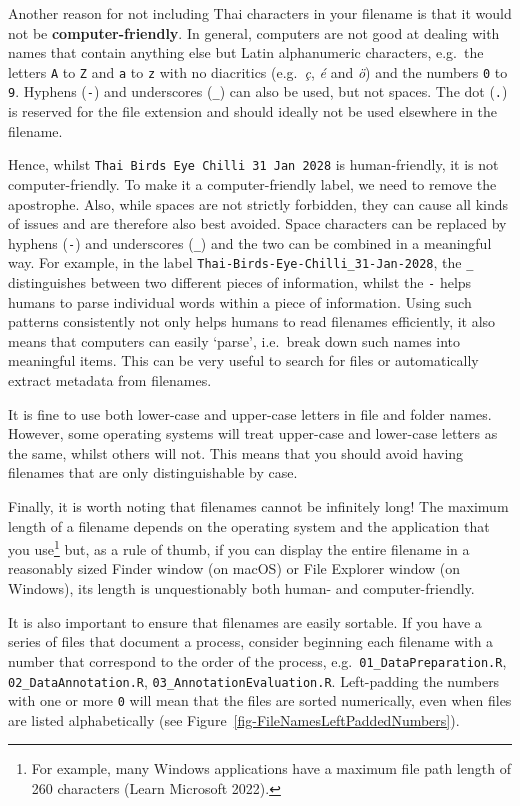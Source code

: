 \documentclass[
  letterpaper,
  DIV=11,
  numbers=noendperiod]{scrreprt}
\begin{document}
Another reason for not including Thai characters in your filename is
that it would not be \textbf{computer-friendly}. In general, computers
are not good at dealing with names that contain anything else but Latin
alphanumeric characters, e.g.~the letters \texttt{A} to \texttt{Z} and
\texttt{a} to \texttt{z} with no diacritics (e.g.~\emph{ç}, \emph{é} and
\emph{ö}) and the numbers \texttt{0} to \texttt{9}. Hyphens (\texttt{-})
and underscores (\texttt{\_}) can also be used, but not spaces. The dot
(\texttt{.}) is reserved for the file extension and should ideally not
be used elsewhere in the filename.

Hence, whilst
\texttt{Thai\ Bird\textquotesingle{}s\ Eye\ Chilli\ 31\ Jan\ 2028} is
human-friendly, it is not computer-friendly. To make it a
computer-friendly label, we need to remove the apostrophe. Also, while
spaces are not strictly forbidden, they can cause all kinds of issues
and are therefore also best avoided. Space characters can be replaced by
hyphens (\texttt{-}) and underscores (\texttt{\_}) and the two can be
combined in a meaningful way. For example, in the label
\texttt{Thai-Birds-Eye-Chilli\_31-Jan-2028}, the \texttt{\_}
distinguishes between two different pieces of information, whilst the
\texttt{-} helps humans to parse individual words within a piece of
information. Using such patterns consistently not only helps humans to
read filenames efficiently, it also means that computers can easily
`parse', i.e.~break down such names into meaningful items. This can be
very useful to search for files or automatically extract metadata from
filenames.

It is fine to use both lower-case and upper-case letters in file and
folder names. However, some operating systems will treat upper-case and
lower-case letters as the same, whilst others will not. This means that
you should avoid having filenames that are only distinguishable by case.

Finally, it is worth noting that filenames cannot be infinitely long!
The maximum length of a filename depends on the operating system and the
application that you use\footnote{For example, many Windows applications
  have a maximum file path length of 260 characters (Learn Microsoft
  2022).} but, as a rule of thumb, if you can display the entire
filename in a reasonably sized Finder window (on macOS) or File Explorer
window (on Windows), its length is unquestionably both human- and
computer-friendly.

It is also important to ensure that filenames are easily sortable. If
you have a series of files that document a process, consider beginning
each filename with a number that correspond to the order of the process,
e.g.~\texttt{01\_DataPreparation.R}, \texttt{02\_DataAnnotation.R},
\texttt{03\_AnnotationEvaluation.R}. Left-padding the numbers with one
or more \texttt{0} will mean that the files are sorted numerically, even
when files are listed alphabetically (see
Figure~\ref{fig-FileNamesLeftPaddedNumbers}).
\end{document}

